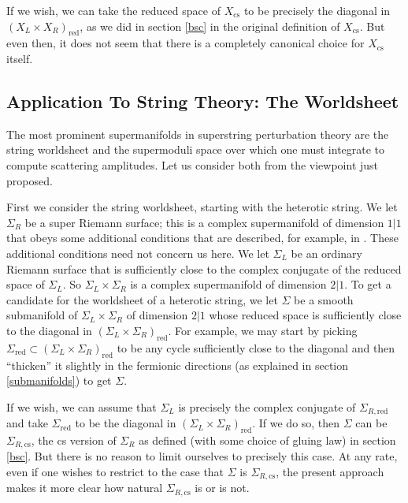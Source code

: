 \documentclass[11pt,a4paper]{article}
\def\cs{{\mathrm{cs}}}
\def\SIgma{\Sigma}
\def\red{{\mathrm{red}}}
\begin{document}
If we wish, we can take the reduced space of $X_\cs$ to be precisely the diagonal in $(X_L\times X_R)_\red$, as we did in section 
\ref{bsc} in the original definition of $X_\cs$.  But even then,
it does not seem that there is a completely canonical choice for $X_\cs$ itself.   

\subsection{Application To String Theory: The Worldsheet}\label{applistring}

The most prominent supermanifolds in superstring perturbation theory are the string worldsheet and the supermoduli space over which one
must integrate to compute scattering amplitudes.  Let us consider both from the viewpoint just proposed.

First we consider the string worldsheet, starting with the heterotic string.  We let $\Sigma_R$ be a super Riemann surface; this is a complex
supermanifold of dimension $1|1$ that obeys some additional conditions that are described, for example, in \cite{supersurf}.
These additional conditions need not concern us here.  We let $\Sigma_L$ be an ordinary Riemann surface that is sufficiently close
to the complex conjugate of the reduced space of $\Sigma_L$.   So $\Sigma_L\times \Sigma_R$ is a complex supermanifold
of dimension $2|1$.  To get a candidate for the worldsheet of a heterotic string, we let $\Sigma$ be a smooth submanifold of $\Sigma_L\times \SIgma_R$
of dimension $2|1$ whose reduced space is sufficiently close to the diagonal in $(\Sigma_L\times \Sigma_R)_\red$.  For example,
we may start by picking $\Sigma_\red\subset (\SIgma_L\times \Sigma_R)_\red$ to be any cycle sufficiently close to the diagonal 
and then ``thicken'' it slightly in the fermionic directions (as explained in section \ref{submanifolds}) to get
$\Sigma$.  


If we wish, we can assume that $\Sigma_L$ is precisely the complex conjugate
of $\Sigma_{R,\red}$ and take $\Sigma_\red$ to be the diagonal in $(\SIgma_L\times \Sigma_R)_\red$.  If we do so, then $\Sigma$
can be $\Sigma_{R,\cs}$, the cs version of $\Sigma_R$ as defined (with some choice of gluing law)
in section \ref{bsc}.  But there is no reason to limit ourselves to precisely this case.  At any rate,
even if one wishes to restrict to the case that $\Sigma$ is $\Sigma_{R,\cs}$, the present approach makes it more clear how natural 
$\Sigma_{R,\cs}$ is or is not.
\end{document}
